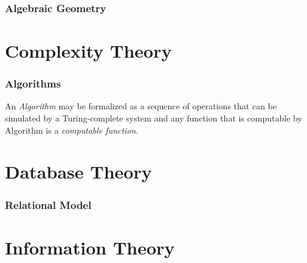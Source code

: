\documentclass{article}
\begin{document}
\section{Algebraic Geometry}\label{sec:algebraic_geometry}


\part{Complexity Theory}

\section{Algorithms}

An \emph{Algorithm} may be formalized as a sequence of operations that
can be simulated by a Turing-complete system and any function
that is computable by Algorithm is a \emph{computable function}.

\part{Database Theory}\label{sec:database_theory}

\section{Relational Model}\label{sec:relational_model}

\part{Information Theory}\label{sec:information_theory}

\end{document}

